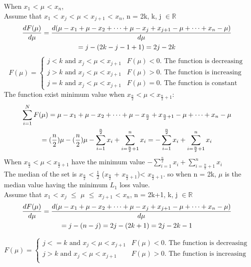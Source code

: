 \documentclass{article}
\begin{document}
When $x_1$ < $\mu$ < $x_n$,\\
Assume that $x_1$ < $x_j$ < $\mu$ < $x_{j+1}$ < $x_n$, n = 2k, k, j $\in \mathbb{R}$
\begin{gather}
\frac{dF(\mu)}{d\mu} = \frac{d(\mu - x_1 + \mu - x_2 + \cdots + \mu - x_j  + x_{j+1} - \mu + \cdots + x_n - \mu)}{d\mu} \notag \\
= j - (2k -j-1 +1) = 2j - 2k 
\end{gather}
\[
F(\mu) = \begin{cases}
j < k \text{ and } x_j < \mu < x_{j+1} & F(\mu) < 0 \text{. The function is decreasing}\\
j > k  \text{ and }  x_j < \mu < x_{j+1} &  F(\mu) > 0 \text{. The function is increasing}\\
j = k  \text{ and } x_j < \mu < x_{j+1} &  F(\mu) = 0 \text{. The function is constant}
\end{cases}
\]
The function exist minimum value when $x_{\frac{n}{2}} < \mu < x_{\frac{n}{2}+1}$: 
\begin{gather}
\sum_{i=1}^{N} F(\mu) = \mu - x_1 + \mu - x_2 + \cdots + \mu - x_{\frac{n}{2}}  + x_{\frac{n}{2}+1} - \mu + \cdots + x_n - \mu \notag\\ = (\frac{n}{2})\mu - (\frac{n}{2})\mu - \sum_{i=1}^{\frac{n}{2}} x_i + \sum_{i=\frac{n}{2}+1}^{n} x_i = - \sum_{i=1}^{\frac{n}{2}} x_i + \sum_{i=\frac{n}{2}+1}^{n} x_i
\end{gather}
When $ x_{\frac{n}{2}} < \mu < x_{\frac{n}{2}+1}$ have the minimum value $- \sum_{i=1}^{\frac{n}{2}} x_i + \sum_{i=\frac{n}{2}+1}^{n} x_i$\\
The median of the set is $ x_{\frac{n}{2}}$  < $\frac{1}{2}$ ($x_{\frac{n}{2}}$ + $x_{\frac{n}{2}+1}$)< $ x_{\frac{n}{2}+1}$. so when n = 2k, $\mu$ is the median value having the minimum $L_1$ loss value.\\

Assume that $x_1$ < $x_j$ $\leq$ $\mu$ $\leq$ $x_{j+1}$ < $x_n$, n = 2k+1, k, j $\in \mathbb{R}$\\
\begin{gather}
\frac{dF(\mu)}{d\mu} = \frac{d(\mu - x_1 + \mu -x_2 + \cdots + \mu - x_j + x_{j+1} - \mu + \cdots + x_n - \mu)}{d\mu} \notag\\
= j - (n-j) = 2j - (2k + 1) = 2j - 2k -1
\end{gather}

\[
F(\mu) = \begin{cases}
j <= k \text{ and } x_j < \mu < x_{j+1} & F(\mu) < 0 \text{. The function is decreasing}\\
j > k  \text{ and }  x_j < \mu < x_{j+1} &  F(\mu) > 0 \text{. The function is increasing}\\
\end{cases}
\]
\end{document}
